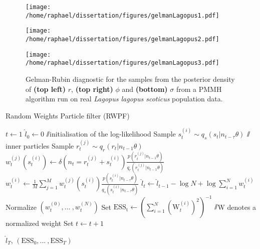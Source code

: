 \documentclass[12pt]{article}
\begin{document}
	\clearpage
	\begin{figure}[htb]
		\centering
		\begin{minipage}{0.4\textwidth}
			\centering
			\texttt{[image: /home/raphael/dissertation/figures/gelmanLagopus1.pdf]}
		\end{minipage}
		\begin{minipage}{0.4\textwidth}
			\centering
			\texttt{[image: /home/raphael/dissertation/figures/gelmanLagopus2.pdf]}
		\end{minipage}
		\begin{minipage}{0.4\textwidth}
			\centering
			\texttt{[image: /home/raphael/dissertation/figures/gelmanLagopus3.pdf]}
		\end{minipage}
		\caption[Gelman-Rubin diagnostic of the chains of a PMMH algorithm run on real \emph{Lagopus lagopus scoticus} population data]{Gelman-Rubin diagnostic for the samples from the posterior density of \textbf{(top left)} $r$, \textbf{(top right)} $\phi$ and \textbf{(bottom)} $\sigma$ from a PMMH algorithm run on real \emph{Lagopus lagopus scoticus} population data.}
		\label{fig:gelmanLagopus}
	\end{figure}
	
	\begin{algorithm}
		\caption{Random Weights Particle filter (RWPF)}\label{RWPF}
		\begin{algorithmic}[1]
			\State $t \gets 1$
			\State $\hat{l}_0 \gets 0$ $\sslash$initialisation of the log-likelihood
			\State Sample $s_t^{(i)} \sim q_s(s_t| n_{t-\tau} \theta)$
			 $\sslash$inner particles
			\State Sample $r_t^{(j)} \sim q_r(r_t| n_{t-1} \theta)$
			\State $w_t^{(j)}(s_t^{(i)}) \gets \delta(n_t=r_t^{(j)}+s_t^{(i)})\frac{p(r_t^{(j)}| n_{t-1} \theta)}{q_r(r_t^{(j)}| n_{t-1} \theta)}$
			\EndFor
			\State $w_t^{(i)} \gets \frac{1}{M}\sum_{j=1}^{M}w_t^{(j)}(s_t^{(i)}) \frac{p(s_t^{(i)}| n_{t-\tau} \theta)}{q_s(s_t^{(i)}| n_{t-\tau} \theta)}$
			\EndFor
			\State $\hat{l}_t \gets \hat{l}_{t-1} - \log N + \log\sum_{i=1}^{N}w_t^{(i)}$
			\State Normalize $(w_t^{(0)}, \text{...}\ , w_t^{(N)})$
			\State Set $\mathrm{ESS_t} \gets (\sum_{i=1}^{N}(\mathrm{W}_t^{(i)})^2)^{-1}$ $\sslash$W denotes a normalized weight
			\State Set $t \gets t+1$
			\EndWhile
			\item[]
			\Return $\hat{l}_T$,  $(\mathrm{ESS}_0, \text{...}\ , \mathrm{ESS}_T)$
			\EndFunction
		\end{algorithmic}
	\end{algorithm}
\end{document}
